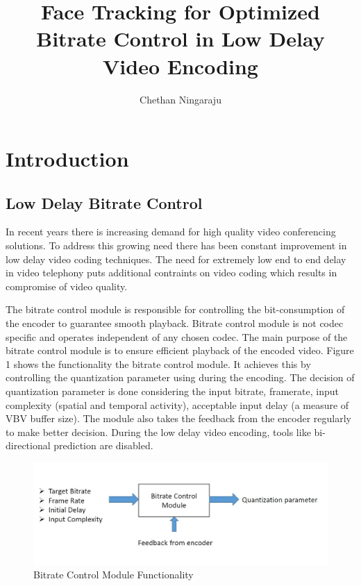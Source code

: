 \documentclass[11pt]{article} %
\title{Face Tracking for Optimized Bitrate Control in Low Delay Video Encoding}
\author{Chethan Ningaraju}
\begin{document}
\maketitle
\clearpage
\tableofcontents
\clearpage
\section{Introduction}
  \subsection{Low Delay Bitrate Control}
	In recent years there is increasing demand for high quality video conferencing solutions. To address this growing need there has been constant improvement in  low delay video coding techniques. The need for extremely low end to end delay in video telephony puts additional contraints on video coding which results in compromise of video quality.

	The bitrate control module is responsible for controlling the bit-consumption of the encoder to guarantee smooth playback. Bitrate control module is not codec specific and operates independent of any chosen codec. The main purpose of the bitrate control module is to ensure efficient playback of the encoded video. Figure 1 shows the functionality the bitrate control module. It achieves this by controlling the quantization parameter using during the encoding. The decision of quantization parameter is done considering the input bitrate, framerate, input complexity (spatial and temporal activity), acceptable input delay (a measure of VBV buffer size). The module also takes the feedback from the encoder regularly to make better decision.  During the low delay video encoding, tools like bi-directional  	prediction are disabled.

\begin{figure}[h]
    \centering
    \includegraphics[scale=0.5]{RC_block}
    \caption{Bitrate Control Module Functionality}
    \label{fig:Bitrate Control Module Functionality}
\end{figure} 
\end{document}
